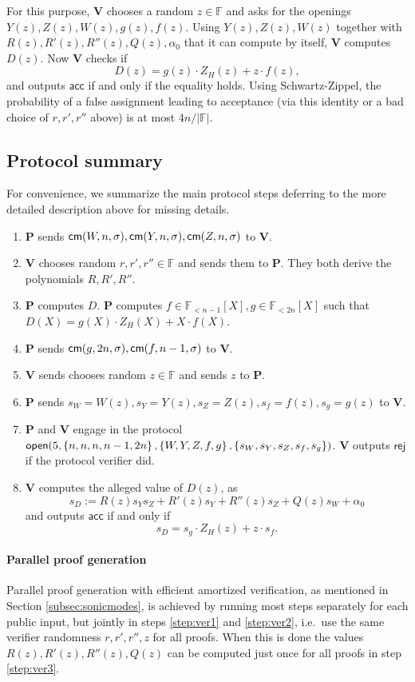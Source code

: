 \documentclass[11pt]{article}
\numberwithin{figure}{section} %
\newcommand{\set}[1]{\ensuremath{\left\{#1\right\}}\xspace}
\newcommand{\F}{\ensuremath{\mathbb F}\xspace}
\newcommand{\rej}{\ensuremath{\mathsf{rej}}\xspace}
\newcommand{\acc}{\ensuremath{\mathsf{acc}}\xspace}
\newcommand{\defeq}{:=}
\newcommand{\prv}{\ensuremath{\mathsf{\mathbf{P}}}\xspace}
\newcommand{\ver}{\ensuremath{\mathsf{\mathbf{V}}}\xspace}
\newcommand{\polysofdeg}[1]{\ensuremath{\F_{< #1}[X]}\xspace}
\begin{document}
For this purpose, \ver chooses a random $z\in \F$ and asks for the openings $Y (z), Z(z), W(z), g(z), f(z)$. Using  $Y(z),Z(z),W(z)$ together with $R(z), R'(z), R''(z), Q(z), \alpha_0$ that it can compute by itself, \ver computes $D(z)$. Now \ver checks if
\[D(z) = g(z) \cdot Z_H(z) + z \cdot f(z),\]
and outputs \acc if and only if the equality holds.
Using Schwartz-Zippel, the probability of a false assignment leading to acceptance (via this identity or a bad choice of $r, r', r''$ above) is at most $4n/|\F|$.

\subsection{Protocol summary}
For convenience, we summarize the main protocol steps deferring to the more detailed description above for missing details.

\begin{enumerate}
 \item \prv sends $\mathsf{cm}(W,n,\sigma),\mathsf{cm}(Y,n,\sigma),\mathsf{cm}(Z,n,\sigma)$ to \ver.
 \item\label{step:ver1} \ver chooses random $r,r',r''\in \F$ and sends them to \prv. They both derive the polynomials $R,R',R''$.
 \item \prv computes $D$. \prv computes $f\in \polysofdeg{n-1},g\in \polysofdeg{2n}$ such that $D(X)=g(X)\cdot Z_H(X) + X\cdot f(X)$.
 \item \prv sends $\mathsf{cm}(g,2n,\sigma), \mathsf{cm}(f,n-1,\sigma)$ to \ver.
 \item\label{step:ver2} \ver sends chooses random $z\in \F$ and sends $z$ to \prv.
 \item \prv sends $s_W = W(z),s_Y= Y(z),s_Z = Z(z),s_f = f(z),s_g = g(z)$ to \ver.
 \item  \prv and \ver engage in the protocol $\open(5,\set{n,n,n,n-1,2n},\set{W,Y,Z,f,g},\set{s_W,s_Y,s_Z,s_f,s_g})$. \ver outputs \rej if the protocol verifier did.
 \item\label{step:ver3} \ver computes the alleged value of $D(z)$, as 
 \[s_D\defeq R(z)s_Y s_Z + R'(z)s_Y+ R''(z)s_Z+ Q(z)s_W + \alpha_0  \]
and outputs \acc if and only if \[s_D = s_g \cdot Z_H(z) + z \cdot s_f.\]
 
\end{enumerate}


\paragraph{Parallel proof generation}
Parallel proof generation with efficient amortized verification, as mentioned in Section \ref{subsec:sonicmodes}, is achieved by running most steps separately for each public input, but jointly in steps \ref{step:ver1} and \ref{step:ver2}, i.e.\ use the same verifier randomness $r,r',r'',z$ for all proofs. When this is done the values $R(z),R'(z),R''(z),Q(z)$ can be computed just once for all proofs in step \ref{step:ver3}.
\end{document}
